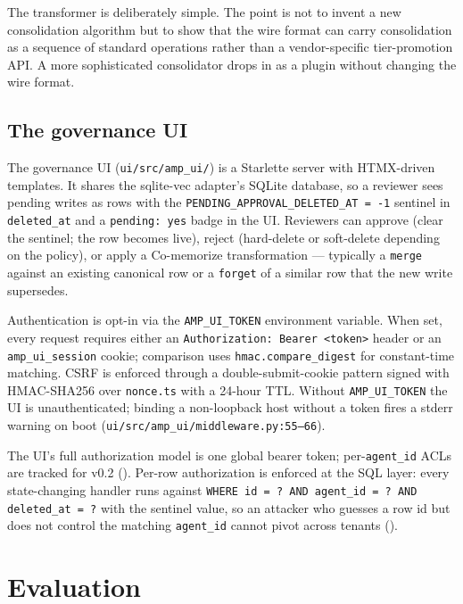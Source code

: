 \documentclass[11pt,letterpaper,twocolumn]{article}
\begin{document}
The transformer is deliberately simple. The point is not to invent a new consolidation algorithm but to show that the wire format can carry consolidation as a sequence of standard operations rather than a vendor-specific tier-promotion API. A more sophisticated consolidator drops in as a plugin without changing the wire format.

\subsection{The governance UI}
\label{sec:impl-ui}

The governance UI (\texttt{ui/src/amp\_ui/}) is a Starlette server with HTMX-driven templates. It shares the sqlite-vec adapter's SQLite database, so a reviewer sees pending writes as rows with the \texttt{PENDING\_APPROVAL\_DELETED\_AT = -1} sentinel in \texttt{deleted\_at} and a \texttt{pending: yes} badge in the UI. Reviewers can approve (clear the sentinel; the row becomes live), reject (hard-delete or soft-delete depending on the policy), or apply a Co-memorize transformation --- typically a \texttt{merge} against an existing canonical row or a \texttt{forget} of a similar row that the new write supersedes.

Authentication is opt-in via the \texttt{AMP\_UI\_TOKEN} environment variable. When set, every request requires either an \texttt{Authorization: Bearer <token>} header or an \texttt{amp\_ui\_session} cookie; comparison uses \texttt{hmac.compare\_digest} for constant-time matching. CSRF is enforced through a double-submit-cookie pattern signed with HMAC-SHA256 over \texttt{nonce.ts} with a 24-hour TTL. Without \texttt{AMP\_UI\_TOKEN} the UI is unauthenticated; binding a non-loopback host without a token fires a stderr warning on boot (\texttt{ui/src/amp\_ui/middleware.py:55--66}).

The UI's full authorization model is one global bearer token; per-\texttt{agent\_id} ACLs are tracked for v0.2 (). Per-row authorization is enforced at the SQL layer: every state-changing handler runs against \texttt{WHERE id = ? AND agent\_id = ? AND deleted\_at = ?} with the sentinel value, so an attacker who guesses a row id but does not control the matching \texttt{agent\_id} cannot pivot across tenants ().

\section{Evaluation}
\label{sec:eval}
\end{document}
